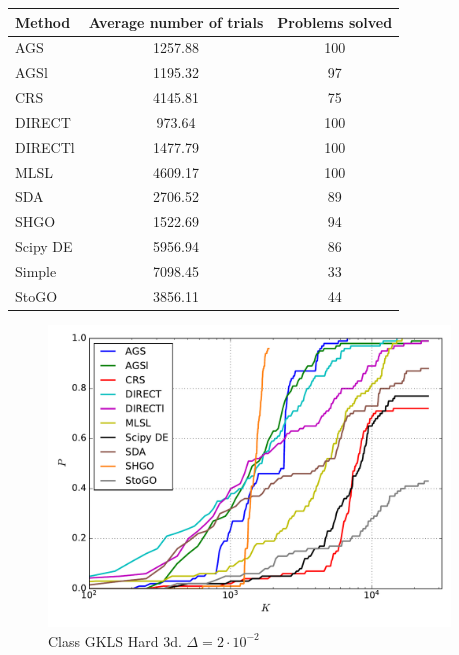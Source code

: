 \documentclass[a4paper]{article}
\begin{document}
\begin{tabular}{lcc}
\hline
 Method   &  Average number of trials  &  Problems solved  \\
\hline
 AGS      &          1257.88           &        100        \\
 AGSl     &          1195.32           &        97         \\
 CRS      &          4145.81           &        75         \\
 DIRECT   &           973.64           &        100        \\
 DIRECTl  &          1477.79           &        100        \\
 MLSL     &          4609.17           &        100        \\
 SDA      &          2706.52           &        89         \\
 SHGO     &          1522.69           &        94         \\
 Scipy DE &          5956.94           &        86         \\
 Simple   &          7098.45           &        33         \\
 StoGO    &          3856.11           &        44         \\
\hline
\end{tabular}
\begin{figure}[H]
  \center
  \includegraphics[width=0.95\textwidth]{../experiments/gklsh3d/cmc.pdf}
  \caption{Class GKLS Hard 3d. $\Delta=2\cdot10^{-2}$}
\end{figure}
\end{document}
